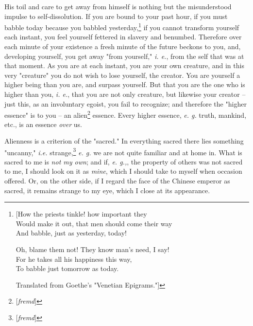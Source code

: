 His toil and care to get away from himself is nothing but the misunderstood 
impulse to self-dissolution. If you are bound to your past hour, if you must 
babble today because you babbled yesterday,\footnote{[How the priests tinkle! 
how important they\\
 Would make it out, that men should come their way\\
 And babble, just as yesterday, today!

Oh, blame them not! They know man's need, I say!\\
 For he takes all his happiness this way,\\
 To babble just tomorrow as today.

Translated from Goethe's "{}Venetian Epigrams."{}]

} if you cannot transform yourself each instant, you feel yourself fettered in 
slavery and benumbed. Therefore over each minute of your existence a fresh 
minute of the future beckons to you, and, developing yourself, you get away 
"{}from yourself,"{} \textit{i. e.}, from the self that was at that moment. As 
you are at each instant, you are your own creature, and in this very 
"{}creature"{} you do not wish to lose yourself, the creator. You are yourself 
a higher being than you are, and surpass yourself. But that you are the one 
who is higher than you, \textit{i. e.}, that you are not only creature, but 
likewise your creator -- just this, as an involuntary egoist, you fail to 
recognize; and therefore the "{}higher essence"{} is to you -- an 
alien\footnote{[\textit{fremd}]} essence. Every higher essence, \textit{e. g.} 
truth, mankind, etc., is an essence \textit{over} us.

Alienness is a criterion of the "{}sacred."{} In everything sacred there lies 
something "{}uncanny,"{} \textit{i.e.} strange,\footnote{[\textit{fremd}]} 
\textit{e. g.} we are not quite familiar and at home in. What is sacred to me 
is \textit{not my own}; and if, \textit{e. g.,}, the property of others was 
not sacred to me, I should look on it as \textit{mine}, which I should take to 
myself when occasion offered. Or, on the other side, if I regard the face of 
the Chinese emperor as sacred, it remains strange to my eye, which I close at 
its appearance.

